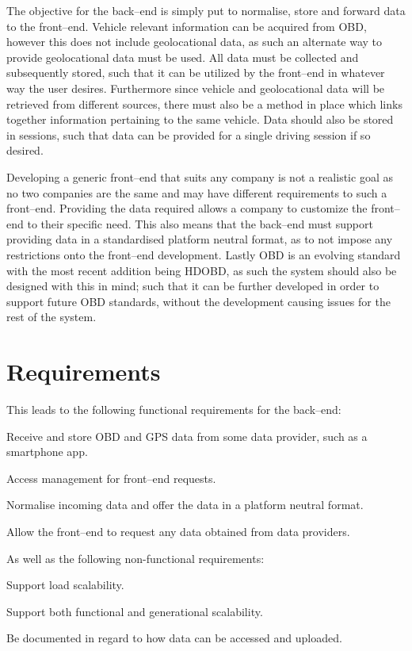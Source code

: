 \bigskip
The objective for the back--end is simply put to normalise, store and forward data to the front--end.
Vehicle relevant information can be acquired from \ac{OBD}, however this does not include geolocational data, as such an alternate way to provide geolocational data must be used.
All data must be collected and subsequently stored, such that it can be utilized by the front--end in whatever way the user desires.
Furthermore since vehicle and geolocational data will be retrieved from different sources, there must also be a method in place which links together information pertaining to the same vehicle.
Data should also be stored in sessions, such that data can be provided for a single driving session if so desired.

Developing a generic front--end that suits any company is not a realistic goal as no two companies are the same and may have different requirements to such a front--end.
Providing the data required allows a company to customize the front--end to their specific need.
This also means that the back--end must support providing data in a standardised platform neutral format, as to not impose any restrictions onto the front--end development.
Lastly \ac{OBD} is an evolving standard with the most recent addition being \ac{HDOBD}, as such the system should also be designed with this in mind; such that it can be further developed in order to support future \ac{OBD} standards, without the development causing issues for the rest of the system.

\section{Requirements}\label{sec:requirements}
This leads to the following functional requirements for the back--end:
\begin{eletterate}
    \item Receive and store \ac{OBD} and GPS data from some data provider, such as a smartphone app.
    \item Access management for front--end requests.
    \item Normalise incoming data and offer the data in a platform neutral format. %
    \item Allow the front--end to request any data obtained from data providers.
\end{eletterate}
As well as the following non-functional requirements:
\begin{eletterate}
    \item Support load scalability.%
    \item Support both functional and generational scalability.
    \item Be documented in regard to how data can be accessed and uploaded.
\end{eletterate}


